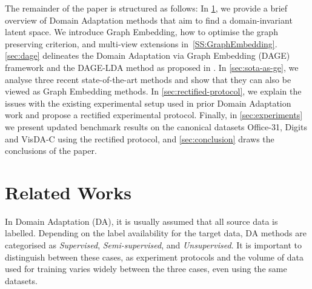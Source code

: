 \documentclass[journal]{IEEEtran}
\begin{document}
The remainder of the paper is structured as follows: In \cref{sec:related-work}, we provide a brief overview of Domain Adaptation methods that aim to find a domain-invariant latent space. We introduce Graph Embedding, how to optimise the graph preserving criterion, and multi-view extensions in~\cref{SS:GraphEmbedding}. \cref{sec:dage} delineates the Domain Adaptation via Graph Embedding (DAGE) framework and the DAGE-LDA method as proposed in \cite{hedegaard2020supervised}. In \cref{sec:sota-as-ge}, we analyse three recent state-of-the-art methods and show that they can also be viewed as Graph Embedding methods. In \cref{sec:rectified-protocol}, we explain the issues with the existing experimental setup used in prior Domain Adaptation work and propose a rectified experimental protocol. Finally, in \cref{sec:experiments} we present updated benchmark results on the canonical datasets Office-31, Digits and VisDA-C using the rectified protocol, and \cref{sec:conclusion} draws the conclusions of the paper.



 \section{Related Works} \label{sec:related-work}

In Domain Adaptation (DA), it is usually assumed that all source data is labelled. Depending on the label availability for the target data, DA methods are categorised as \textit{Supervised}, \textit{Semi-supervised}, and \textit{Unsupervised}. It is important to distinguish between these cases, as experiment protocols and the volume of data used for training varies widely between the three cases, even using the same datasets. 
\end{document}
